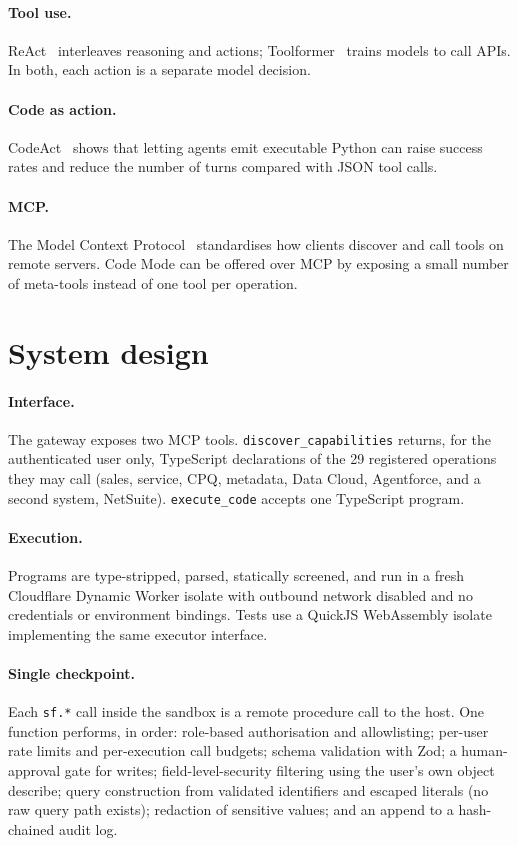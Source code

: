 \documentclass[11pt]{article}
\begin{document}
\paragraph{Tool use.} ReAct~\cite{react} interleaves reasoning and actions; Toolformer~\cite{toolformer} trains models to call APIs. In both, each action is a separate model decision.
\paragraph{Code as action.} CodeAct~\cite{codeact} shows that letting agents emit executable Python can raise success rates and reduce the number of turns compared with JSON tool calls.
\paragraph{MCP.} The Model Context Protocol~\cite{mcp} standardises how clients discover and call tools on remote servers. Code Mode can be offered over MCP by exposing a small number of meta-tools instead of one tool per operation.

\section{System design}\label{sec:design}
\paragraph{Interface.} The gateway exposes two MCP tools. \texttt{discover\_capabilities} returns, for the authenticated user only, TypeScript declarations of the 29 registered operations they may call (sales, service, CPQ, metadata, Data Cloud, Agentforce, and a second system, NetSuite). \texttt{execute\_code} accepts one TypeScript program.
\paragraph{Execution.} Programs are type-stripped, parsed, statically screened, and run in a fresh Cloudflare Dynamic Worker isolate with outbound network disabled and no credentials or environment bindings. Tests use a QuickJS WebAssembly isolate implementing the same executor interface.
\paragraph{Single checkpoint.} Each \texttt{sf.*} call inside the sandbox is a remote procedure call to the host. One function performs, in order: role-based authorisation and allowlisting; per-user rate limits and per-execution call budgets; schema validation with Zod; a human-approval gate for writes; field-level-security filtering using the user's own object describe; query construction from validated identifiers and escaped literals (no raw query path exists); redaction of sensitive values; and an append to a hash-chained audit log.
\end{document}
